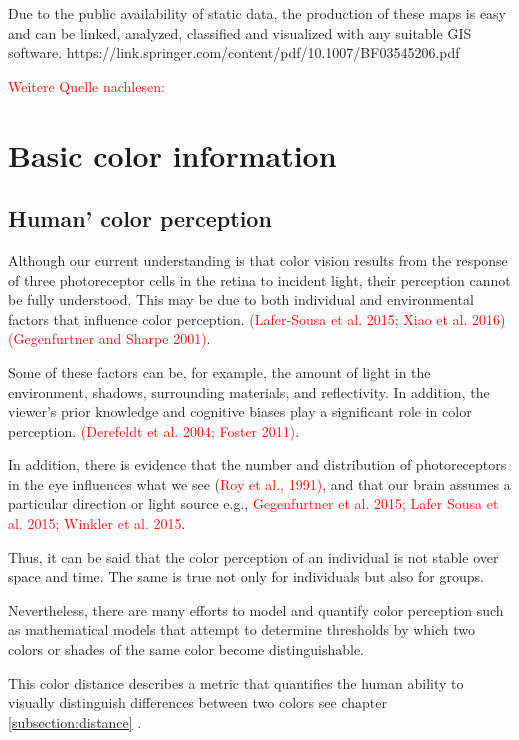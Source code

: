 Due to the public availability of static data, the production of these maps is easy and can be linked, analyzed, classified and visualized with any suitable GIS software. https://link.springer.com/content/pdf/10.1007/BF03545206.pdf

\textcolor{red}{Weitere Quelle nachlesen: \textcite{schiewe2015}}

\section{Basic color information}

\subsection{Human' color perception}
Although our current understanding is that color vision results from the response of three photoreceptor cells in the retina to incident light, their perception cannot be fully understood. This may be due to both individual and environmental factors that influence color perception. \textcolor{red}{(Lafer-Sousa et al. 2015; Xiao et al. 2016) (Gegenfurtner and Sharpe 2001)}. 

Some of these factors can be, for example, the amount of light in the environment, shadows, surrounding materials, and reflectivity. In addition, the viewer's prior knowledge and cognitive biases play a significant role in color perception. \textcolor{red}{(Derefeldt et al. 2004; Foster 2011)}. 

In addition, there is evidence that the number and distribution of photoreceptors in the eye influences what we see (\textcolor{red}{Roy et al., 1991)}, and that our brain assumes a particular direction or light source e.g., \textcolor{red}{Gegenfurtner et al. 2015; Lafer Sousa et al. 2015; Winkler et al. 2015}. 

Thus, it can be said that the color perception of an individual is not stable over space and time. The same is true not only for individuals but also for groups.  

Nevertheless, there are many efforts to model and quantify color perception such as mathematical models that attempt to determine thresholds by which two colors or shades of the same color become distinguishable. 

This color distance describes a metric that quantifies the human ability to visually distinguish differences between two colors see chapter \ref{subsection:distance} \parencite{coltekin2017}.


